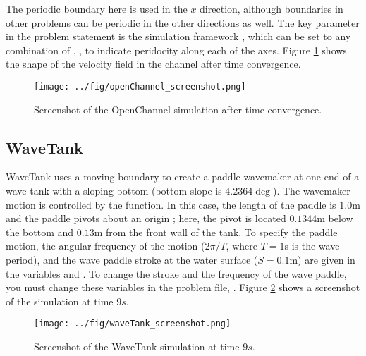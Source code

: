 \documentclass{../GPUSPHtemplate}
\begin{document}
The periodic boundary here is used in the $x$ direction, although
boundaries in other problems can be periodic in the other directions as
well. The key parameter in the problem statement is the simulation
framework , which can be set to any combination of
, ,  to indicate
peridocity along each of the axes.
Figure \ref{fig:OpenChannel} shows the shape of the velocity field in 
the channel after time convergence.
\begin{figure}[h]
  \begin{center}
    \texttt{[image: ../fig/openChannel\_screenshot.png]}
    \caption{Screenshot of the OpenChannel simulation after time convergence.}\label{fig:OpenChannel}
  \end{center}
\end{figure}

\subsection{WaveTank}

WaveTank uses a moving boundary to create a paddle wavemaker at one end
of a wave tank with a sloping bottom (bottom slope is $4.2364\deg$). The
wavemaker motion is controlled by the  function. In
this case, the length of the paddle is $1.0$m and the paddle pivots
about an origin ; here, the pivot is located $0.1344$m
below the bottom and $0.13$m from the front wall of the tank. To specify
the paddle motion, the angular frequency of the motion ($2 \pi/T$, where
$T=1$s is the wave period), and the wave paddle stroke at the water
surface ($S=0.1$m) are given in the variables  and
. To change the stroke and the frequency of the wave
paddle, you must change these variables in the problem file,
.
Figure \ref{fig:WaveTank} shows a screenshot of the simulation at time $9s$.

\iffalse
\begin{figure}[h]
\centering{%
\texttt{[image: paddle.png]}%
}
\caption{Schematic of the wave paddle for \cmd{WaveTank.cc}}
\end{figure}
\else
\fi

\begin{figure}[h]
  \begin{center}
    \texttt{[image: ../fig/waveTank\_screenshot.png]}
    \caption{Screenshot of the WaveTank simulation at time $9s$.}\label{fig:WaveTank}
  \end{center}
\end{figure}
\end{document}
